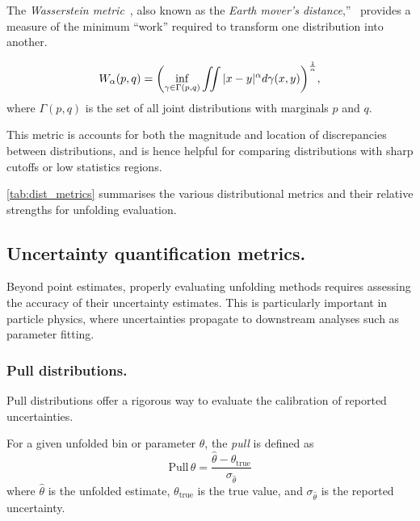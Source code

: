             The \emph{Wasserstein metric}~\cite{L.N.VasersteinIssue3Pagesnobr6472/nobr}, also known as the \emph{Earth mover's distance},''~\cite{rubner_metric_1998} provides a measure of the minimum ``work'' required to transform one distribution into another.
        \begin{definition}
            \begin{equation}
            W_\alpha(p, q) = \qty(\inf_{\gamma \in \Gamma(p, q)} \iint |x-y|^\alpha d\gamma(x, y))^{\frac1\alpha},
        \end{equation}
        where \(\Gamma(p, q)\) is the set of all joint distributions with marginals \(p\) and \(q\).
    \end{definition}

        This metric is accounts for both the magnitude and location of discrepancies between distributions, and is hence helpful for comparing distributions with sharp cutoffs or low statistics regions.

        \cref{tab:dist_metrics} summarises the various distributional metrics and their relative strengths for unfolding evaluation.
        

        \subsection{Uncertainty quantification metrics.}
        Beyond point estimates, properly evaluating unfolding methods requires assessing the accuracy of their uncertainty estimates. 
        This is particularly important in particle physics, where uncertainties propagate to downstream analyses such as parameter fitting.

        \subsubsection{Pull distributions.}
        \label{subsubsec:pull-distributions}
            Pull distributions offer a rigorous way to evaluate the calibration of reported uncertainties.
            
            \begin{definition}
            \label{def:pull-distribution}
                For a given unfolded bin or parameter \(\theta\), the \emph{pull} is defined as
            \begin{equation}
                \text{Pull}\,{\theta} = \frac{\hat{\theta} - \theta_{\text{true}}}{\sigma_{\hat{\theta}}}
            \end{equation}
            where \(\hat{\theta}\) is the unfolded estimate, \(\theta_{\text{true}}\) is the true value, and \(\sigma_{\hat{\theta}}\) is the reported uncertainty.
        \end{definition}

